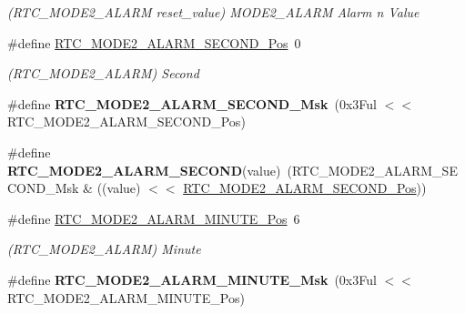 \begin{DoxyCompactItemize}
\begin{DoxyCompactList}\small\item\em (R\+T\+C\+\_\+\+M\+O\+D\+E2\+\_\+\+A\+L\+A\+R\+M reset\+\_\+value) M\+O\+D\+E2\+\_\+\+A\+L\+A\+R\+M Alarm n Value \end{DoxyCompactList}\item 
\hypertarget{group___s_a_m_l21___r_t_c_gab0459350afcdb559e1ca3c3940e86019}{}\#define \hyperlink{group___s_a_m_l21___r_t_c_gab0459350afcdb559e1ca3c3940e86019}{R\+T\+C\+\_\+\+M\+O\+D\+E2\+\_\+\+A\+L\+A\+R\+M\+\_\+\+S\+E\+C\+O\+N\+D\+\_\+\+Pos}~0\label{group___s_a_m_l21___r_t_c_gab0459350afcdb559e1ca3c3940e86019}

\begin{DoxyCompactList}\small\item\em (R\+T\+C\+\_\+\+M\+O\+D\+E2\+\_\+\+A\+L\+A\+R\+M) Second \end{DoxyCompactList}\item 
\hypertarget{group___s_a_m_l21___r_t_c_ga7616292e9a00994e6d3d02185790c71e}{}\#define {\bfseries R\+T\+C\+\_\+\+M\+O\+D\+E2\+\_\+\+A\+L\+A\+R\+M\+\_\+\+S\+E\+C\+O\+N\+D\+\_\+\+Msk}~(0x3\+Ful $<$$<$ R\+T\+C\+\_\+\+M\+O\+D\+E2\+\_\+\+A\+L\+A\+R\+M\+\_\+\+S\+E\+C\+O\+N\+D\+\_\+\+Pos)\label{group___s_a_m_l21___r_t_c_ga7616292e9a00994e6d3d02185790c71e}

\item 
\hypertarget{group___s_a_m_l21___r_t_c_gac384d194202d70210b552e779e11a27c}{}\#define {\bfseries R\+T\+C\+\_\+\+M\+O\+D\+E2\+\_\+\+A\+L\+A\+R\+M\+\_\+\+S\+E\+C\+O\+N\+D}(value)~(R\+T\+C\+\_\+\+M\+O\+D\+E2\+\_\+\+A\+L\+A\+R\+M\+\_\+\+S\+E\+C\+O\+N\+D\+\_\+\+Msk \& ((value) $<$$<$ \hyperlink{group___s_a_m_l21___r_t_c_gab0459350afcdb559e1ca3c3940e86019}{R\+T\+C\+\_\+\+M\+O\+D\+E2\+\_\+\+A\+L\+A\+R\+M\+\_\+\+S\+E\+C\+O\+N\+D\+\_\+\+Pos}))\label{group___s_a_m_l21___r_t_c_gac384d194202d70210b552e779e11a27c}

\item 
\hypertarget{group___s_a_m_l21___r_t_c_gad7ad89da3e48045de0a22785979dd782}{}\#define \hyperlink{group___s_a_m_l21___r_t_c_gad7ad89da3e48045de0a22785979dd782}{R\+T\+C\+\_\+\+M\+O\+D\+E2\+\_\+\+A\+L\+A\+R\+M\+\_\+\+M\+I\+N\+U\+T\+E\+\_\+\+Pos}~6\label{group___s_a_m_l21___r_t_c_gad7ad89da3e48045de0a22785979dd782}

\begin{DoxyCompactList}\small\item\em (R\+T\+C\+\_\+\+M\+O\+D\+E2\+\_\+\+A\+L\+A\+R\+M) Minute \end{DoxyCompactList}\item 
\hypertarget{group___s_a_m_l21___r_t_c_ga9dcef52eb867793ac6c988fcfe70c821}{}\#define {\bfseries R\+T\+C\+\_\+\+M\+O\+D\+E2\+\_\+\+A\+L\+A\+R\+M\+\_\+\+M\+I\+N\+U\+T\+E\+\_\+\+Msk}~(0x3\+Ful $<$$<$ R\+T\+C\+\_\+\+M\+O\+D\+E2\+\_\+\+A\+L\+A\+R\+M\+\_\+\+M\+I\+N\+U\+T\+E\+\_\+\+Pos)\label{group___s_a_m_l21___r_t_c_ga9dcef52eb867793ac6c988fcfe70c821}


\end{DoxyCompactItemize}
